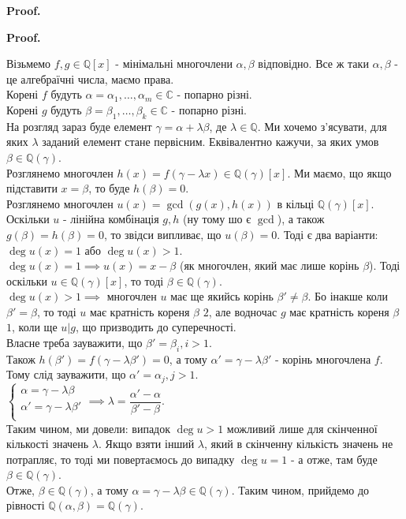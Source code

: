 \documentclass[a4paper, 14pt]{extarticle}
\makeatletter
\theoremstyle{theoremdd}
\theoremstyle{theoremdd}
\theoremstyle{theoremdd}
\theoremstyle{theoremdd}
\theoremstyle{theoremdd}
\theoremstyle{theoremdd}
\theoremstyle{theoremdd}
\theoremstyle{theoremdd}
\def\qed{$\blacksquare$}
\renewenvironment{proof}[1][Proof.\\]{\par
\pushQED{\hfill \qed}%
\normalfont \topsep6\p@\@plus6\p@\relax
\trivlist
\item\relax
{\bfseries
#1\@addpunct{.}}\hspace\labelsep\ignorespaces
}{%
\popQED\endtrivlist\@endpefalse
}
\makeatother
\begin{document}
\begin{proof}
\begin{proof}
Візьмемо $f,g \in \mathbb{Q}[x]$ - мінімальні многочлени $\alpha,\beta$ відповідно. Все ж таки $\alpha,\beta$ - це алгебраїчні числа, маємо права.\\
Корені $f$ будуть $\alpha = \alpha_1,\dots,\alpha_m \in \mathbb{C}$ - попарно різні.\\
Корені $g$ будуть $\beta = \beta_1,\dots,\beta_k \in \mathbb{C}$ - попарно різні.\\
На розгляд зараз буде елемент $\gamma = \alpha + \lambda \beta$, де $\lambda \in \mathbb{Q}$. Ми хочемо з'ясувати, для яких $\lambda$ заданий елемент стане первісним. Еквівалентно кажучи, за яких умов $\beta \in \mathbb{Q}(\gamma)$.\\
Розглянемо многочлен $h(x) = f(\gamma - \lambda x) \in \mathbb{Q}(\gamma)[x]$. Ми маємо, що якщо підставити $x = \beta$, то буде $h(\beta) = 0$.\\
Розглянемо многочлен $u(x) = \gcd (g(x),h(x))$ в кільці $\mathbb{Q}(\gamma)[x]$.\\
Оскільки $u$ - лінійна комбінація $g,h$ (ну тому шо є $\gcd$), а також $g(\beta) = h(\beta) = 0$, то звідси випливає, що $u(\beta) = 0$. Тоді є два варіанти:\\
$\deg u(x) = 1$ або $\deg u(x) > 1$.\\
$\deg u(x) = 1 \implies u(x) = x-\beta$ (як многочлен, який має лише корінь $\beta$). Тоді оскільки $u \in \mathbb{Q}(\gamma)[x]$, то тоді $\beta \in \mathbb{Q}(\gamma)$.\\
$\deg u(x) > 1 \implies$ многочлен $u$ має ще якийсь корінь $\beta' \neq \beta$. Бо інакше коли $\beta' = \beta$, то тоді $u$ має кратність кореня $\beta$ $2$, але водночас $g$ має кратність кореня $\beta$ $1$, коли ще $u | g$, що призводить до суперечності.\\
Власне треба зауважити, що $\beta' = \beta_i, i > 1$.\\
Також $h(\beta') = f(\gamma-\lambda \beta') = 0$, а тому $\alpha' = \gamma - \lambda \beta'$ - корінь многочлена $f$. Тому слід зауважити, що $\alpha' = \alpha_j, j > 1$.\\
$\begin{cases}
\alpha = \gamma - \lambda \beta \\
\alpha' = \gamma - \lambda \beta' \\
\end{cases} \implies \lambda = \dfrac{\alpha'-\alpha}{\beta'-\beta}$.\\
Таким чином, ми довели: випадок $\deg u > 1$ можливий лише для скінченної кількості значень $\lambda$. Якщо взяти інший $\lambda$, який в скінченну кількість значень не потрапляє, то тоді ми повертаємось до випадку $\deg u = 1$ - а отже, там буде $\beta \in \mathbb{Q}(\gamma)$.
\bigskip \\
Отже, $\beta \in \mathbb{Q}(\gamma)$, а тому $\alpha = \gamma - \lambda \beta \in \mathbb{Q}(\gamma)$. Таким чином, прийдемо до рівності $\mathbb{Q}(\alpha,\beta) = \mathbb{Q}(\gamma)$.
\end{proof}


\end{proof}
\end{document}
